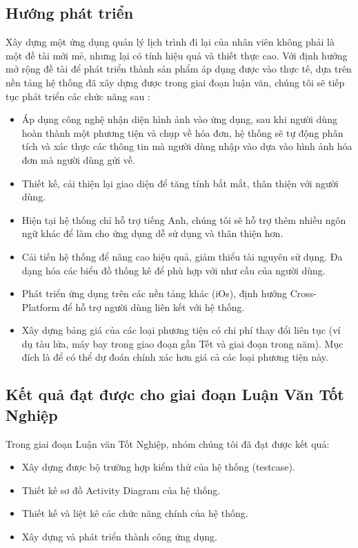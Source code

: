 \documentclass[a4paper]{article}
\begin{document}
\subsection{Hướng phát triển}
Xây dựng một ứng dụng quản lý lịch trình đi lại của nhân viên không phải là một đề tài mới mẻ, nhưng lại có tính hiệu quả và thiết thực cao. Với định hướng mở rộng đề tài để phát triển thành sản phẩm áp dụng được vào thực tế, dựa trên nền tảng hệ thống đã xây dựng được trong giai đoạn luận văn, chúng tôi sẽ tiếp tục phát triển các chức năng sau :
\begin{itemize}
    \item Áp dụng công nghệ nhận diện hình ảnh vào ứng dụng, sau khi người dùng hoàn thành một phương tiện và chụp về hóa đơn, hệ thống sẽ tự động phân tích và xác thực các thông tin mà người dùng nhập vào dựa vào hình ảnh hóa đơn mà người dùng gửi về.
    \item Thiết kế, cải thiện lại giao diện để tăng tính bắt mắt, thân thiện với người dùng.
    \item Hiện tại hệ thống chỉ hỗ trợ tiếng Anh, chúng tôi sẽ hỗ trợ thêm nhiều ngôn ngữ khác để làm cho ứng dụng dễ sử dụng và thân thiện hơn.
    \item Cải tiến hệ thống để nâng cao hiệu quả, giảm thiểu tài nguyên sử dụng. Đa dạng hóa các biểu đồ thống kê để phù hợp với như cầu của người dùng.
    \item Phát triển ứng dụng trên các nền tảng khác (iOs), định hướng Cross-Platform để hỗ trợ người dùng liên kết với hệ thống.
    \item Xây dựng bảng giá của các loại phương tiện có chi phí thay đổi liên tục (ví dụ tàu lửa, máy bay trong giao đoạn gần Tết và giai đoạn trong năm). Mục đích là để có thể dự đoán chính xác hơn giá cả các loại phương tiện này.
\end{itemize}
\subsection*{Kết quả đạt được cho giai đoạn Luận Văn Tốt Nghiệp}
Trong giai đoạn Luận văn Tốt Nghiệp, nhóm chúng tôi đã đạt được kết quả:
\begin{itemize}
\item Xây dựng được bộ trường hợp kiểm thử của hệ thống (testcase).
\item Thiết kế sơ đồ Activity Diagram của hệ thống.
\item Thiết kế và liệt kê các chức năng chính của hệ thống.
\item Xây dựng và phát triển thành công ứng dụng.
\end{itemize}
\end{document}
